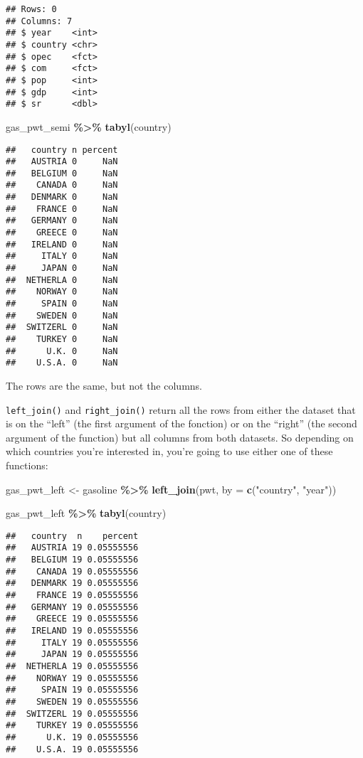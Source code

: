 \documentclass[
]{article}
\newenvironment{Shaded}{\begin{snugshade}}{\end{snugshade}}
\newcommand{\DataTypeTok}[1]{\textcolor[rgb]{0.13,0.29,0.53}{#1}}
\newcommand{\KeywordTok}[1]{\textcolor[rgb]{0.13,0.29,0.53}{\textbf{#1}}}
\newcommand{\NormalTok}[1]{#1}
\newcommand{\OperatorTok}[1]{\textcolor[rgb]{0.81,0.36,0.00}{\textbf{#1}}}
\newcommand{\StringTok}[1]{\textcolor[rgb]{0.31,0.60,0.02}{#1}}
\begin{document}
\begin{verbatim}
## Rows: 0
## Columns: 7
## $ year    <int> 
## $ country <chr> 
## $ opec    <fct> 
## $ com     <fct> 
## $ pop     <int> 
## $ gdp     <int> 
## $ sr      <dbl>
\end{verbatim}

\begin{Shaded}
\begin{Highlighting}[]
\NormalTok{gas\_pwt\_semi }\OperatorTok{\%\textgreater{}\%}
\StringTok{  }\KeywordTok{tabyl}\NormalTok{(country)}
\end{Highlighting}
\end{Shaded}

\begin{verbatim}
##   country n percent
##   AUSTRIA 0     NaN
##   BELGIUM 0     NaN
##    CANADA 0     NaN
##   DENMARK 0     NaN
##    FRANCE 0     NaN
##   GERMANY 0     NaN
##    GREECE 0     NaN
##   IRELAND 0     NaN
##     ITALY 0     NaN
##     JAPAN 0     NaN
##  NETHERLA 0     NaN
##    NORWAY 0     NaN
##     SPAIN 0     NaN
##    SWEDEN 0     NaN
##  SWITZERL 0     NaN
##    TURKEY 0     NaN
##      U.K. 0     NaN
##    U.S.A. 0     NaN
\end{verbatim}

The rows are the same, but not the columns.

\texttt{left\_join()} and \texttt{right\_join()} return all the rows from either the dataset that is on the
``left'' (the first argument of the fonction) or on the ``right'' (the second argument of the
function) but all columns from both datasets. So depending on which countries you're interested in,
you're going to use either one of these functions:

\begin{Shaded}
\begin{Highlighting}[]
\NormalTok{gas\_pwt\_left \textless{}{-}}\StringTok{ }\NormalTok{gasoline }\OperatorTok{\%\textgreater{}\%}
\StringTok{  }\KeywordTok{left\_join}\NormalTok{(pwt, }\DataTypeTok{by =} \KeywordTok{c}\NormalTok{(}\StringTok{"country"}\NormalTok{, }\StringTok{"year"}\NormalTok{))}

\NormalTok{gas\_pwt\_left }\OperatorTok{\%\textgreater{}\%}
\StringTok{  }\KeywordTok{tabyl}\NormalTok{(country)}
\end{Highlighting}
\end{Shaded}

\begin{verbatim}
##   country  n    percent
##   AUSTRIA 19 0.05555556
##   BELGIUM 19 0.05555556
##    CANADA 19 0.05555556
##   DENMARK 19 0.05555556
##    FRANCE 19 0.05555556
##   GERMANY 19 0.05555556
##    GREECE 19 0.05555556
##   IRELAND 19 0.05555556
##     ITALY 19 0.05555556
##     JAPAN 19 0.05555556
##  NETHERLA 19 0.05555556
##    NORWAY 19 0.05555556
##     SPAIN 19 0.05555556
##    SWEDEN 19 0.05555556
##  SWITZERL 19 0.05555556
##    TURKEY 19 0.05555556
##      U.K. 19 0.05555556
##    U.S.A. 19 0.05555556
\end{verbatim}
\end{document}
